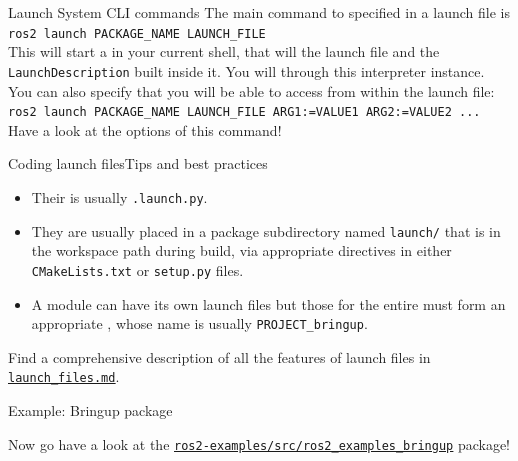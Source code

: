 \begin{frame}{Launch System CLI commands}
  \justifying
  The main command to  specified in a launch file is\\
  \bigskip
  \texttt{ros2 launch PACKAGE\_NAME LAUNCH\_FILE}\\
  \bigskip
  This will start a  in your current shell, that will  the launch file and  the \texttt{LaunchDescription} built inside it. You will  through this interpreter instance. You can also specify  that you will be able to access from within the launch file:\\
  \bigskip
  \texttt{ros2 launch PACKAGE\_NAME LAUNCH\_FILE ARG1:=VALUE1 ARG2:=VALUE2 ...}\\
  \bigskip
  Have a look at the options of this command!
\end{frame}

\begin{frame}{Coding launch files}{Tips and best practices}
  \justifying
	\begin{itemize}
		\item Their  is usually \texttt{.launch.py}.
		\item They are usually placed in a package subdirectory named \texttt{launch/} that is  in the workspace path during build, via appropriate directives in either \texttt{CMakeLists.txt} or \texttt{setup.py} files.
		\item A module can have its own launch files but those for the entire  must form an appropriate , whose name is usually \texttt{PROJECT\_bringup}.
	\end{itemize}
  \bigskip
	\begin{block}{}
		\centering
		Find a comprehensive description of all the features of launch files in \href{https://github.com/IntelligentSystemsLabUTV/ros2-examples/blob/jazzy/launch_files.md}{\color{blue}\underline{\texttt{launch\_files.md}}}.
	\end{block}
\end{frame}

\begin{frame}{Example: Bringup package}
  \begin{block}{}
    \centering
	  Now go have a look at the \href{https://github.com/IntelligentSystemsLabUTV/ros2-examples/tree/jazzy/src/ros2_examples_bringup}{\color{blue}\underline{\texttt{ros2-examples/src/ros2\_examples\_bringup}}} package!
  \end{block}
\end{frame}
